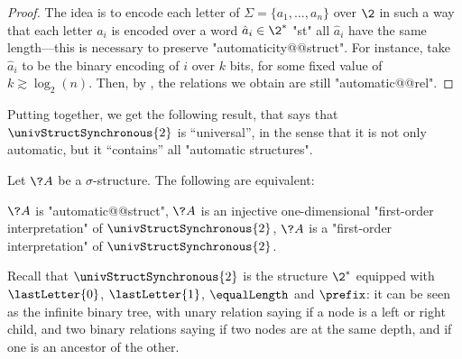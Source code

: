 \begin{proof}
	The idea is to encode each letter of $\Sigma = \{a_1,\dotsc,a_n\}$
	over $\2$ in such a way that each letter $a_i$
	is encoded over a word $\hat a_i \in \2^*$ "st"
	all $\hat a_i$ have the same length---this is necessary to preserve "automaticity@@struct".
	For instance, take $\hat a_i$ to be the binary encoding of $i$
	over $k$ bits, for some fixed value of $k \gtrsim \log_2(n)$.
	Then, by ,
	the relations we obtain are still "automatic@@rel".
\end{proof}

Putting 
together, we get the following result, that says that $\univStructSynchronous{2}$ is ``universal'',
in the sense that it is not only automatic, but it ``contains'' all "automatic structures".
\begin{proposition}
	\AP\label{prop:universal-automatic-structure}
	Let $\?A$ be a $\sigma$-structure. The following are equivalent:
	\begin{enumerate}
		\itemAP\label{item:universal-automatic-structure-auto}
			$\?A$ is "automatic@@struct",
		\itemAP\label{item:universal-automatic-structure-injective-FO}
			$\?A$ is an injective one-dimensional "first-order interpretation" of
			$\univStructSynchronous{2}$,
		\itemAP\label{item:universal-automatic-structure-FO}
			$\?A$ is a "first-order interpretation" of $\univStructSynchronous{2}$.
	\end{enumerate}
\end{proposition}

Recall that $\univStructSynchronous{2}$ is the structure $\2^*$ equipped
with $\lastLetter{0}$, $\lastLetter{1}$, $\equalLength$ and $\prefix$: it can be
seen as the infinite binary tree, with unary relation saying if a node is a
left or right child, and two binary relations saying if two nodes are
at the same depth, and if one is an ancestor of the other.

